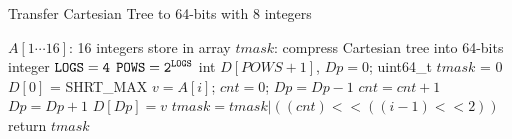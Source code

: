 \begin{algorithm*}
  \caption{Transfer Cartesian Tree to 64-bits with 8 integers}
  \label{alg:cartesian-to-64bits}
  \begin{algorithmic}[1]
    \Require
      $A[1 \cdots 16]$: 16 integers store in array
    \Ensure 
      $\textit{tmask}$: compress Cartesian tree into 64-bits integer
      \State $\tt{LOGS} = 4$
      \State $\tt{POWS} = 2^{\tt{LOGS}}$
      \State int $D[POWS+1]$, $Dp = 0$;
      \State uint64\_t $tmask$ = $0$
      \State $D[0]$ = SHRT\_MAX
        \State $v = A[i]$;
        \State $cnt = 0$;
          \State $Dp = Dp-1$
          \State $cnt = cnt + 1$
        \EndWhile
        \State $Dp = Dp+1$
        \State $D[Dp] = v$
        \State $tmask = tmask | ((cnt)<<((i-1)<<2))$
      \EndFor
      \State return $tmask$
  \end{algorithmic}
\end{algorithm*}